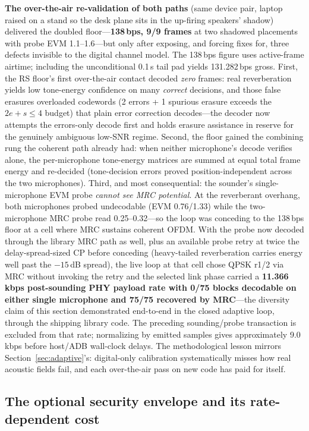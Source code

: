 \documentclass[11pt]{article}
\begin{document}
\textbf{The over-the-air re-validation of both paths} (same device pair,
laptop raised on a stand so the desk plane sits in the up-firing speakers'
shadow) delivered the doubled floor---\textbf{138\,bps, 9/9 frames} at two
shadowed placements with probe EVM 1.1--1.6---but only after exposing, and
forcing fixes for, three defects invisible to the digital channel model.
The 138\,bps figure uses active-frame airtime; including the unconditional
0.1\,s tail pad yields 131.282\,bps gross.
First, the RS floor's first over-the-air contact decoded \emph{zero} frames:
real reverberation yields low tone-energy confidence on many \emph{correct}
decisions, and those false erasures overloaded codewords (2 errors + 1
spurious erasure exceeds the $2e+s\le4$ budget) that plain error correction
decodes---the decoder now attempts the errors-only decode first and holds
erasure assistance in reserve for the genuinely ambiguous low-SNR regime.
Second, the floor gained the combining rung the coherent path already had:
when neither microphone's decode verifies alone, the per-microphone
tone-energy matrices are summed at equal total frame energy and re-decided
(tone-decision errors proved position-independent across the two
microphones). Third, and most consequential: the sounder's single-microphone
EVM probe \emph{cannot see MRC potential}. At the reverberant overhang, both
microphones probed undecodable (EVM 0.76/1.33) while the two-microphone MRC
probe read 0.25--0.32---so the loop was conceding to the 138\,bps floor at a
cell where MRC sustains coherent OFDM. With the probe now decoded through the
library MRC path as well, plus an available probe retry at twice the
delay-spread-sized CP before conceding (heavy-tailed reverberation carries
energy well past the $-15$\,dB spread), the live loop at that cell chose QPSK
r1/2 via MRC without invoking the retry and the selected link phase
carried a \textbf{11.366\,kbps post-sounding PHY payload rate with 0/75 blocks decodable on either single
microphone and 75/75 recovered by MRC}---the diversity claim of this section
demonstrated end-to-end in the closed adaptive loop, through the shipping
library code. The preceding sounding/probe transaction is excluded from that
rate; normalizing by emitted samples gives approximately 9.0\,kbps before
host/ADB wall-clock delays. The
methodological lesson mirrors Section~\ref{sec:adaptive}'s: digital-only
calibration systematically misses how real acoustic fields fail, and each
over-the-air pass on new code has paid for itself.

\subsection{The optional security envelope and its rate-dependent cost}
\label{sec:crypto}
\end{document}
